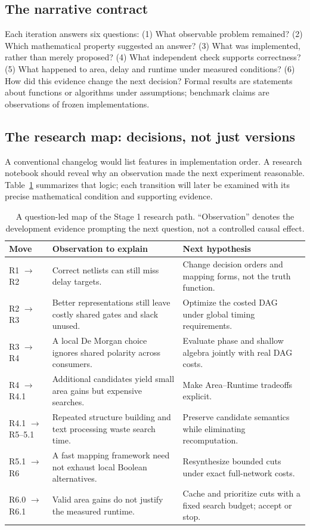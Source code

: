 \documentclass[a4paper,10pt]{article}
\theoremstyle{definition}
\theoremstyle{remark}
\newcounter{problem}
\begin{document}
\subsection{The narrative contract}
Each iteration answers six questions: (1) What observable problem remained? (2) Which mathematical property suggested an answer? (3) What was implemented, rather than merely proposed? (4) What independent check supports correctness? (5) What happened to area, delay and runtime under measured conditions? (6) How did this evidence change the next decision? Formal results are statements about functions or algorithms under assumptions; benchmark claims are observations of frozen implementations.

\subsection{The research map: decisions, not just versions}
A conventional changelog would list features in implementation order. A research notebook should reveal why an observation made the next experiment reasonable. Table~\ref{tab:decisionmap} summarizes that logic; each transition will later be examined with its precise mathematical condition and supporting evidence.
\begin{table}[H]
\centering\footnotesize
\caption{A question-led map of the Stage 1 research path. ``Observation'' denotes the development evidence prompting the next question, not a controlled causal effect.}\label{tab:decisionmap}
\begin{tabularx}{\textwidth}{@{}p{}X X@{}}\toprule
\textbf{Move} & \textbf{Observation to explain} & \textbf{Next hypothesis}\\\midrule
R1 $\to$ R2 & Correct netlists can still miss delay targets. & Change decision orders and mapping forms, not the truth function.\\
R2 $\to$ R3 & Better representations still leave costly shared gates and slack unused. & Optimize the costed DAG under global timing requirements.\\
R3 $\to$ R4 & A local De Morgan choice ignores shared polarity across consumers. & Evaluate phase and shallow algebra jointly with real DAG costs.\\
R4 $\to$ R4.1 & Additional candidates yield small area gains but expensive searches. & Make Area--Runtime tradeoffs explicit.\\
R4.1 $\to$ R5--5.1 & Repeated structure building and text processing waste search time. & Preserve candidate semantics while eliminating recomputation.\\
R5.1 $\to$ R6 & A fast mapping framework need not exhaust local Boolean alternatives. & Resynthesize bounded cuts under exact full-network costs.\\
R6.0 $\to$ R6.1 & Valid area gains do not justify the measured runtime. & Cache and prioritize cuts with a fixed search budget; accept or stop.\\\bottomrule
\end{tabularx}
\end{table}
\end{document}
